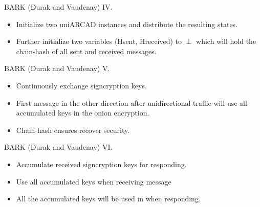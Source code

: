 \documentclass{beamer}
\begin{document}
\begin{frame}{BARK (Durak and Vaudenay) IV.}
   \scriptsize
  \begin{minipage}[h]{0.49\textwidth}
      \begin{figure}[ht]
        \centering
        \setlength{\fboxsep}{10pt}
        \scalebox{0.7}{%
        \fbox{%
          
        }
      }
    \end{figure}
    \end{minipage}
  \begin{minipage}[h]{0.49\textwidth}
      \begin{itemize}
      \item Initialize two uniARCAD instances and distribute the
        resulting states.
      \item Further initialize two variables (Hsent, Hreceived) to $\perp$ which will
        hold the chain-hash of all sent and received messages.
      \end{itemize}
    \end{minipage}
  \end{frame}

\begin{frame}{BARK (Durak and Vaudenay) V.}
  \scriptsize
  \begin{figure}[ht]
     \centering
     \setlength{\fboxsep}{10pt}
     \scalebox{0.5}{%
       \fbox{%
         
       }
     }
  \end{figure}
  \begin{itemize}
  \item Continuously exchange signcryption keys.
  \item First message in the other direction after unidirectional traffic
    will use all accumulated keys in the onion encryption.
  \item Chain-hash ensures recover security.
  \end{itemize}
\end{frame}

\begin{frame}{BARK (Durak and Vaudenay) VI.}
  \scriptsize
  \begin{figure}[ht]
     \centering
     \setlength{\fboxsep}{10pt}
     \scalebox{0.5}{%
       \fbox{%
         
       }
     }
  \end{figure}
  \begin{itemize}
  \item Accumulate received signcryption keys for responding.
  \item Use all accumulated keys when receiving message
  \item All the accumulated keys will be used in when responding.
  \end{itemize}
\end{frame}
\end{document}

